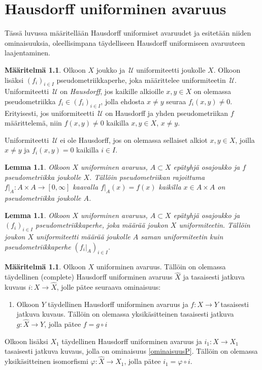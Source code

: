 \documentclass[12pt,a4paper,leqno]{report}
\newcommand{\U}{\,\mathcal{U}}
\theoremstyle{plain}
\newtheorem{lem}[equation]{Lemma}
\theoremstyle{definition}
\newtheorem{maar}[equation]{Määritelmä}
\theoremstyle{remark}
\begin{document}
\chapter{Hausdorff uniforminen avaruus}
Tässä luvussa määritellään Hausdorff uniformiset avaruudet ja 
esitetään niiden ominaisuuksia, 
oleellisimpana täydelliseen Hausdorff uniformiseen avaruuteen laajentaminen.
\begin{maar}
Olkoon $X$ joukko ja $\U$ uniformiteetti joukolle $X$. 
Olkoon lisäksi $(f_i)_{i\in I}$ pseudometriikkaperhe, joka määrittelee uniformiteetin $\U$. 
Uniformiteetti $\U$ on \emph{Hausdorff}, jos kaikille alkioille $x,y\in X$ on 
olemassa pseudometriikka $f_i\in(f_i)_{i\in I}$, 
jolla ehdosta $x\neq y$ seuraa $f_i(x,y)\neq 0$. 
Erityisesti, jos uniformiteetti $\U$ on Hausdorff 
ja yhden pseudometriikan $f$ määrittelemä, 
niin $f(x,y)\neq 0$ kaikilla $x,y\in X$, $x\neq y$.

Uniformiteetti $\U$ ei ole Hausdorff, jos on olemassa sellaiset alkiot $x,y\in X$, joilla $x\neq y$ ja $f_i(x,y)=0$ kaikilla $i\in I$.
\end{maar}
\begin{lem}
Olkoon $X$ uniforminen avaruus, $A\subset X$ epätyhjä osajoukko 
ja $f$ pseudometriikka joukolle $X$. 
Tällöin pseudometriikan rajoittuma 
$f|_A\colon A\times A\rightarrow [0,\infty]$ kaavalla $ f|_A(x)=f(x)$ 
kaikilla $x\in A\times A$ 
on pseudometriikka joukolle $A$. 
\end{lem}
\begin{lem}
Olkoon $X$ uniforminen avaruus, $A\subset X$ epätyhjä osajoukko 
ja $(f_i)_{i\in I}$ pseudometriikkaperhe, 
joka määrää joukon $X$ uniformiteetin. 
Tällöin joukon $X$ uniformiteetti määrää joukolle $A$ saman uniformiteetin 
kuin pseudometriikkaperhe $(f_i|_A)_{i\in I}$.
\end{lem}
\begin{maar}\label{complete}
Olkoon $X$ uniforminen avaruus. 
Tällöin on olemassa täydellinen (com\-plete) Hausdorff 
uniforminen avaruus $\hat X$ ja tasaisesti jatkuva 
kuvaus $i\colon X\rightarrow\hat X$, jolle pätee seuraava ominaisuus:
\begin{enumerate} [label=(P),ref=(P)]
\item %
\label{ominaisuusP}
Olkoon $Y$ täydellinen Hausdorff uniforminen avaruus 
ja $f\colon X\rightarrow Y$ tasaisesti jatkuva kuvaus. 
Tällöin on olemassa yksikäsitteinen tasaisesti 
jatkuva $g\colon \hat X\rightarrow Y$, 
jolla pätee $f=g\circ i$
\end{enumerate}
Olkoon lisäksi $X_1$ täydellinen Hausdorff 
uniforminen avaruus ja $i_1\colon X\rightarrow X_1$
tasaisesti jatkuva kuvaus, jolla on ominaisuus \ref{ominaisuusP}. 
Tällöin on olemassa yksikäsitteinen isomorfismi $\varphi\colon\hat X\rightarrow X_1$, jolla pätee $i_1=\varphi\circ i$.
\end{maar}
\end{document}
